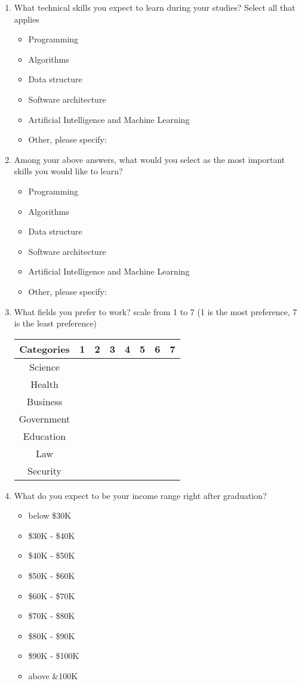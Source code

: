 \documentclass[12pt,a4paper,titlepage]{article}
\begin{document}
\begin{enumerate}
	\item What technical skills you expect to learn during your studies? Select all that applies
	\begin{itemize}
	\renewcommand{\labelitemi}{\scriptsize$\square$}
		\item Programming
		\item Algorithms
		\item Data structure
		\item Software architecture
		\item Artificial Intelligence and Machine Learning
		\item Other, please specify:
	\end{itemize}
	
	\item Among your above answers, what would you select as the most important skills you would like to learn?
	\begin{itemize}
		\item Programming
		\item Algorithms
		\item Data structure
		\item Software architecture
		\item Artificial Intelligence and Machine Learning
		\item Other, please specify:
	\end{itemize}
	
	\item What fields you prefer to work? scale from 1 to 7 (1 is the most preference, 7 is the least preference)
	\begin{table}[H]
 		\begin{tabular}{c r r r r r r r} 					%
 		\hline\hline								%
 		Categories &  1  &  2   &  3  &  4  &  5  &  6  &  7 \\
	 	\hline
 		Science\\
 	 	Health\\
 		Business\\
 		Government\\
 		Education\\
		Law\\
		Security\\
 		\hline
 		\end{tabular}
 	\end{table}

	\item What do you expect to be your income range right after graduation?
	\begin{itemize}
		\item below \$30K
		\item \$30K - \$40K
		\item \$40K - \$50K
		\item \$50K - \$60K
		\item \$60K - \$70K
		\item \$70K - \$80K
		\item \$80K - \$90K
		\item \$90K - \$100K
		\item above \&100K
	\end{itemize}
	

\end{enumerate}
\end{document}
